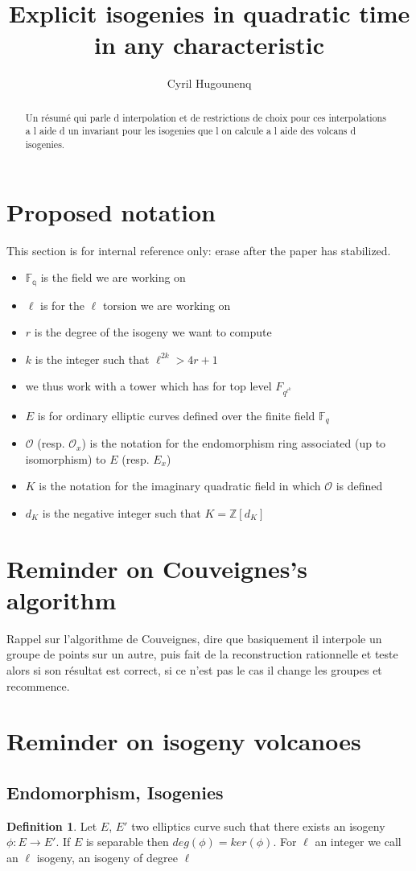 \documentclass{article}
\title{Explicit isogenies in quadratic time in any characteristic}
\author{Cyril Hugounenq}
\theoremstyle{plain}
\theoremstyle{definition}
\newtheorem{defi}[thm]{Definition}
\theoremstyle{remark}
\begin{document}
\begin{abstract}
Un résumé qui parle d interpolation et de restrictions de choix pour ces interpolations a l aide d un invariant pour les isogenies que l on calcule a l aide des volcans d isogenies. 
\end{abstract}

\section*{Proposed notation}

This section is for internal reference only: erase after the paper has
stabilized.

\begin{itemize}
\item $\mathbb{F_q}$ is the field we are working on
\item $\ell$ is for the $\ell$ torsion we are working on
\item $r$ is the degree of the isogeny we want to compute
\item $k$ is the integer such that $\ell^{2k}>4r+1$
\item we thus work with a tower which has for top level $F_{q^{\ell^k}}$
\item $E$ is for ordinary elliptic curves defined over the finite field $\mathbb{F}_q$
\item $\mathcal{O}$ (resp. $\mathcal{O}_x$) is the notation for the endomorphism ring associated (up to isomorphism) to $E$ (resp. $E_x$)
\item $K$ is the notation for the imaginary quadratic field in which $\mathcal{O}$ is defined
\item $d_K$ is the negative integer such that $K=\mathbb{Z}[d_K]$  
\end{itemize}
\section{Reminder on Couveignes's algorithm}
Rappel sur l'algorithme de Couveignes, dire que basiquement il interpole un groupe de points sur un autre, puis fait de la reconstruction rationnelle et teste alors si son résultat est correct, si ce n'est pas le cas il change les groupes et recommence. 


\section{Reminder on isogeny volcanoes}
\subsection{Endomorphism, Isogenies}
\begin{defi}
Let $E$, $E'$ two elliptics curve such that there exists an isogeny $\phi: E \rightarrow E'$. If $E$ is separable then $deg(\phi)=ker(\phi)$. For $\ell$ an integer we call an $\ell$ isogeny, an isogeny of degree $\ell$
\end{defi}
\end{document}
